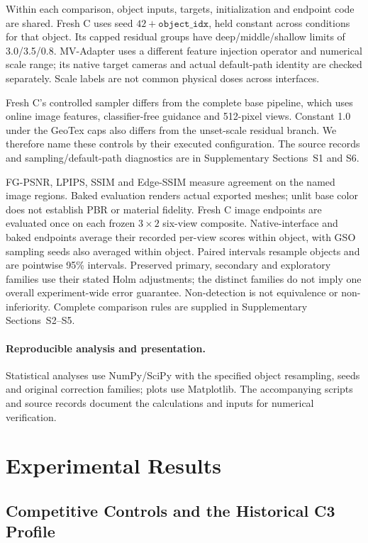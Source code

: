 \documentclass[times,twocolumn,final]{elsarticle}
\begin{document}
Within each comparison, object inputs, targets, initialization and endpoint code are shared. Fresh C uses seed $42+\texttt{object\_idx}$, held constant across conditions for that object. Its capped residual groups have deep/middle/shallow limits of 3.0/3.5/0.8. MV-Adapter uses a different feature injection operator and numerical scale range; its native target cameras and actual default-path identity are checked separately. Scale labels are not common physical doses across interfaces.

Fresh C's controlled sampler differs from the complete base pipeline, which uses online image features, classifier-free guidance and 512-pixel views. Constant 1.0 under the GeoTex caps also differs from the unset-scale residual branch. We therefore name these controls by their executed configuration. The source records and sampling/default-path diagnostics are in Supplementary Sections~S1 and S6.

FG-PSNR, LPIPS, SSIM and Edge-SSIM measure agreement on the named image regions. Baked evaluation renders actual exported meshes; unlit base color does not establish PBR or material fidelity. Fresh C image endpoints are evaluated once on each frozen $3\times2$ six-view composite. Native-interface and baked endpoints average their recorded per-view scores within object, with GSO sampling seeds also averaged within object. Paired intervals resample objects and are pointwise 95\% intervals. Preserved primary, secondary and exploratory families use their stated Holm adjustments; the distinct families do not imply one overall experiment-wide error guarantee. Non-detection is not equivalence or non-inferiority. Complete comparison rules are supplied in Supplementary Sections~S2--S5.

\paragraph{Reproducible analysis and presentation.}
Statistical analyses use NumPy/SciPy with the specified object resampling, seeds and original correction families; plots use Matplotlib. The accompanying scripts and source records document the calculations and inputs for numerical verification.

\section{Experimental Results}
\label{sec:experiments}

\subsection{Competitive Controls and the Historical C3 Profile}
\label{subsec:largescale}
\end{document}

